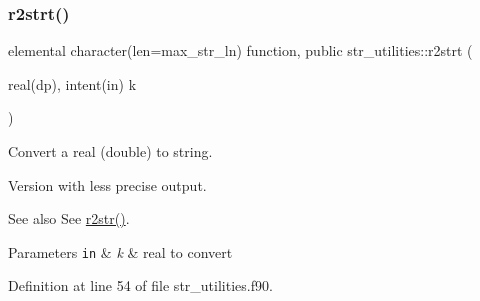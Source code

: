 \subsubsection{\texorpdfstring{r2strt()}{r2strt()}}
{\footnotesize\ttfamily elemental character(len=max\+\_\+str\+\_\+ln) function, public str\+\_\+utilities\+::r2strt (\begin{DoxyParamCaption}\item[{real(dp), intent(in)}]{k }\end{DoxyParamCaption})}



Convert a real (double) to string. 

Version with less precise output.

\begin{DoxySeeAlso}{See also}
See \hyperlink{namespacestr__utilities_a92ac6c0af1979df094de1caddd28ade0}{r2str()}.
\end{DoxySeeAlso}

\begin{DoxyParams}[1]{Parameters}
\mbox{\tt in}  & {\em k} & real to convert \\
\hline
\end{DoxyParams}


Definition at line 54 of file str\+\_\+utilities.\+f90.

